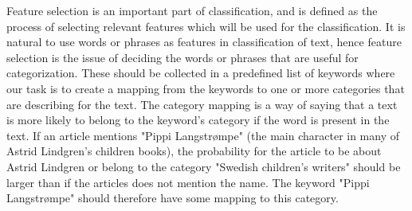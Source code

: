 Feature selection is an important part of classification, and is defined as the process of selecting relevant features which will be used for the classification. It is natural to use words or phrases as features in classification of text, hence feature selection is the issue of deciding the words or phrases that are useful for categorization. These should be collected in a predefined list of keywords where our task is to create a mapping from the keywords to one or more categories that are describing for the text. The category mapping is a way of saying that a text is more likely to belong to the keyword's category if the word is present in the text. If an article mentions "Pippi Langstrømpe" (the main character in many of Astrid Lindgren's children books), the probability for the article to be about Astrid Lindgren or belong to the category "Swedish children's writers" should be larger than if the articles does not mention the name. The keyword "Pippi Langstrømpe" should therefore have some mapping to this category. 
